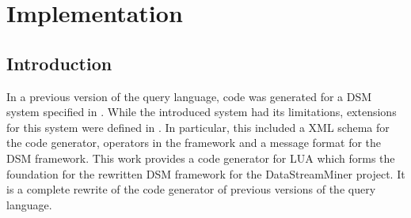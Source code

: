 \section{Implementation}
\subsection{Introduction}
In a previous version of the query language, code was generated for a DSM system
specified in \cite{285:Fischer2010}. While the introduced system had its 
limitations, extensions for this system were defined in \cite{297:Frey2010}. In 
particular, this included a XML schema for the code generator, operators in the 
framework and a message format for the DSM framework. This work provides a code 
generator for LUA which forms the foundation for the rewritten DSM framework for 
the DataStreamMiner project. It is a complete rewrite of the code generator of 
previous versions of the query language.

